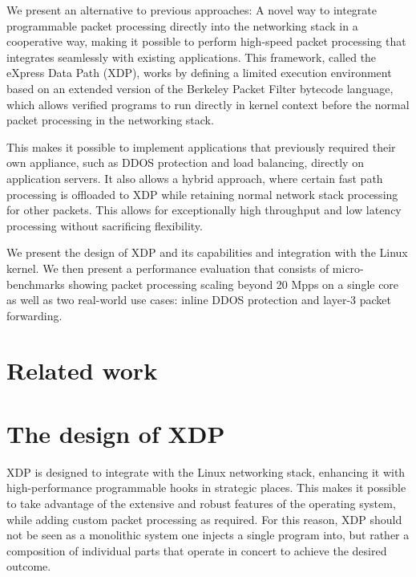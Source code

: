 \documentclass[10pt]{sig-alternate-05-2015}
\begin{document}
We present an alternative to previous approaches: A novel way to integrate
programmable packet processing directly into the networking stack in a
cooperative way, making it possible to perform high-speed packet processing that
integrates seamlessly with existing applications. This framework, called the
eXpress Data Path (XDP), works by defining a limited execution environment based
on an extended version of the Berkeley Packet Filter bytecode language, which
allows verified programs to run directly in kernel context before the normal
packet processing in the networking stack.

This makes it possible to implement applications that previously required their
own appliance, such as DDOS protection and load balancing, directly on
application servers. It also allows a hybrid approach, where certain fast path
processing is offloaded to XDP while retaining normal network stack processing
for other packets. This allows for exceptionally high throughput and low latency
processing without sacrificing flexibility.

We present the design of XDP and its capabilities and integration with the Linux
kernel. We then present a performance evaluation that consists of
micro-benchmarks showing packet processing scaling beyond 20 Mpps on a single
core as well as two real-world use cases: inline DDOS protection and layer-3
packet forwarding.

\section{Related work}
\label{sec:related-work}
\section{The design of XDP}
\label{sec:design}
XDP is designed to integrate with the Linux networking stack, enhancing it with
high-performance programmable hooks in strategic places. This makes it possible
to take advantage of the extensive and robust features of the operating system,
while adding custom packet processing as required. For this reason, XDP should
not be seen as a monolithic system one injects a single program into, but rather
a composition of individual parts that operate in concert to achieve the desired
outcome.
\end{document}
